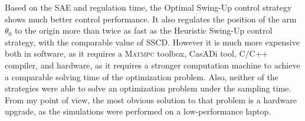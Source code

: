 Based on the SAE and regulation time, the  Optimal Swing-Up control strategy shows much better control performance. It also regulates the position of the arm $\theta_0$ to the origin more than twice as fast as the Heuristic Swing-Up control strategy, with the comparable value of SSCD. However it is much more expensive both in software, as it requires a \textsc{Matmpc} toolbox, CasADi tool, C/C++ compiler, and hardware, as it requires a stronger computation machine to achieve a comparable solving time of the optimization problem. Also, neither of the strategies were able to solve an optimization problem under the sampling time. From my point of view, the most obvious solution to that problem is a hardware upgrade, as the simulations were performed on a low-performance laptop.